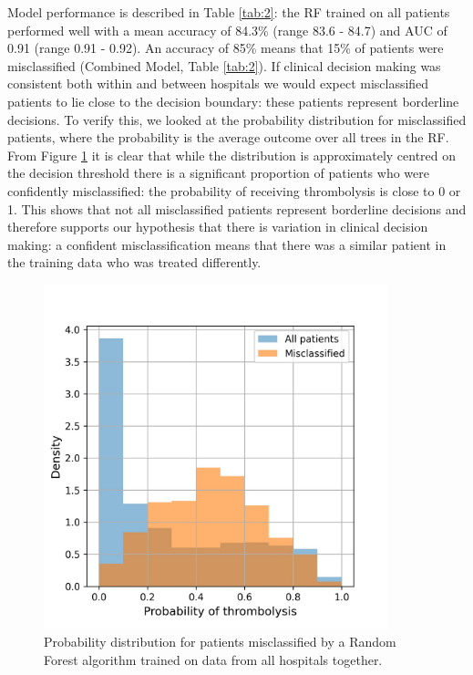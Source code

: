 \documentclass[12pt,a4paper, pdftex]{elsarticle}
\newcommand{\manote}[2][\textcolor{magenta}{\dagger}]{\textcolor{magenta}{$#1$}\marginpar{\color{magenta}\raggedright\tiny$#1$ #2}}
\begin{document}
Model performance is described in Table \ref{tab:2}: the RF trained on all patients performed well with a mean accuracy of 84.3\% (range 83.6 - 84.7) and AUC of 0.91 (range 0.91 - 0.92). An accuracy of 85\% means that 15\% of patients were misclassified (Combined Model, Table \ref{tab:2}). If clinical decision making was consistent both within and between hospitals we would expect misclassified patients to lie close to the decision boundary: these patients represent borderline decisions. To verify this, we looked at the probability distribution for misclassified patients, where the probability is the average outcome over all trees in the RF. From Figure \ref{fig:hist} it is clear that while the distribution is approximately centred on the decision threshold there is a significant proportion of patients who were confidently misclassified: the probability of receiving thrombolysis is close to 0 or 1. This shows that not all misclassified patients represent borderline decisions and therefore supports our hypothesis that there is variation in clinical decision making: a confident misclassification means that there was a similar patient in the training data who was treated differently. %

\begin{figure}[h!!!]
\centering
\includegraphics[width=10cm]{figures/probability_histogram.jpg}
\caption{Probability distribution for patients misclassified by a Random Forest algorithm trained on data from all hospitals together.}
\label{fig:hist}
\end{figure}
\end{document}

